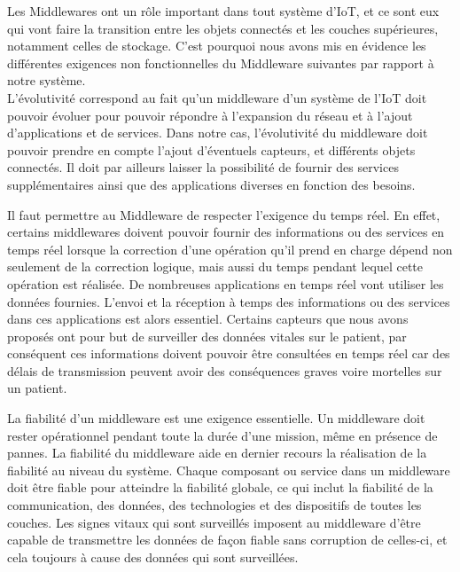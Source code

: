 Les Middlewares ont un rôle important dans tout système d’IoT, et ce sont eux qui vont faire la transition entre les objets connectés et les couches supérieures, notamment celles de stockage. C’est pourquoi nous avons mis en évidence les différentes exigences non fonctionnelles du Middleware suivantes par rapport à notre système.
\\

L'évolutivité correspond au fait  qu'un middleware d’un système de l’IoT doit pouvoir évoluer pour pouvoir répondre à l’expansion du réseau et à l’ajout d’applications et de services. Dans notre cas, l’évolutivité du middleware doit pouvoir prendre en compte l’ajout d’éventuels capteurs, et différents objets connectés. Il doit par ailleurs laisser la possibilité de fournir des services supplémentaires ainsi que des applications diverses en fonction des besoins.

Il faut permettre au Middleware de respecter l'exigence du temps réel. En effet, certains middlewares doivent pouvoir fournir des informations ou des services en temps réel lorsque la correction d'une opération qu’il prend en charge dépend non seulement de la correction logique, mais aussi du temps pendant lequel cette opération est réalisée. De nombreuses applications en temps réel vont utiliser les données fournies. L’envoi et la réception à temps des informations ou des services dans ces applications est alors essentiel. Certains capteurs que nous avons proposés ont pour but de surveiller des données vitales sur le patient, par conséquent ces informations doivent pouvoir être consultées en temps réel car des délais de transmission peuvent avoir des conséquences graves voire mortelles sur un patient.

La fiabilité d'un middleware est une exigence essentielle. Un middleware doit rester opérationnel pendant toute la durée d'une mission, même en présence de pannes. La fiabilité du middleware aide en dernier recours la réalisation de la fiabilité au niveau du système. Chaque composant ou service dans un middleware doit être fiable pour atteindre la fiabilité globale, ce qui inclut la fiabilité de la communication, des données, des technologies et des dispositifs de toutes les couches. Les signes vitaux qui sont surveillés imposent au middleware d’être capable de transmettre les données de façon fiable sans corruption de celles-ci, et cela toujours à cause des données qui sont surveillées.

